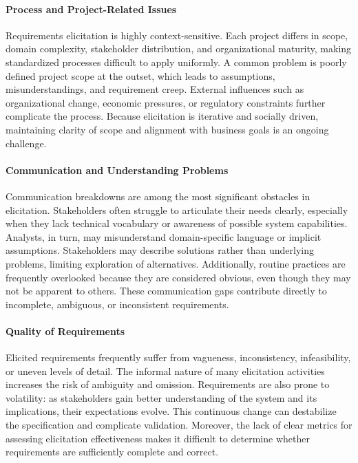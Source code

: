\paragraph{Process and Project-Related Issues}

Requirements elicitation is highly context-sensitive. Each project differs in scope, domain complexity, stakeholder distribution, and organizational maturity, making standardized processes difficult to apply uniformly. A common problem is poorly defined project scope at the outset, which leads to assumptions, misunderstandings, and requirement creep. External influences such as organizational change, economic pressures, or regulatory constraints further complicate the process. Because elicitation is iterative and socially driven, maintaining clarity of scope and alignment with business goals is an ongoing challenge.

\paragraph{Communication and Understanding Problems}

Communication breakdowns are among the most significant obstacles in elicitation. Stakeholders often struggle to articulate their needs clearly, especially when they lack technical vocabulary or awareness of possible system capabilities. Analysts, in turn, may misunderstand domain-specific language or implicit assumptions. Stakeholders may describe solutions rather than underlying problems, limiting exploration of alternatives. Additionally, routine practices are frequently overlooked because they are considered obvious, even though they may not be apparent to others. These communication gaps contribute directly to incomplete, ambiguous, or inconsistent requirements.

\paragraph{Quality of Requirements}

Elicited requirements frequently suffer from vagueness, inconsistency, infeasibility, or uneven levels of detail. The informal nature of many elicitation activities increases the risk of ambiguity and omission. Requirements are also prone to volatility: as stakeholders gain better understanding of the system and its implications, their expectations evolve. This continuous change can destabilize the specification and complicate validation. Moreover, the lack of clear metrics for assessing elicitation effectiveness makes it difficult to determine whether requirements are sufficiently complete and correct.

